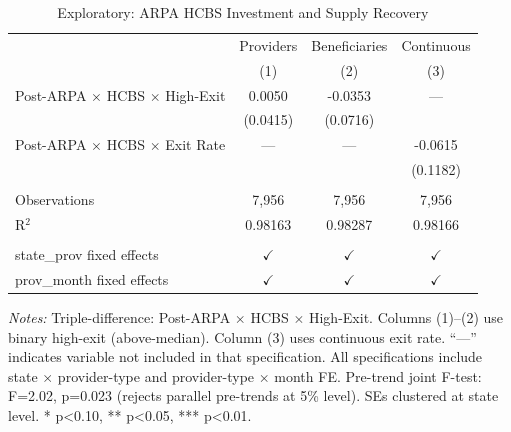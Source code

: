 
\begin{table}[htbp]
   \caption{\label{tab:ddd} Exploratory: ARPA HCBS Investment and Supply Recovery}
   \bigskip
   \centering
   \begin{tabular}{lccc}
      \toprule
                                                   & Providers     & Beneficiaries & Continuous \\   
                                                   & (1)           & (2)           & (3)\\  
      \midrule 
      Post-ARPA $\times$ HCBS $\times$ High-Exit   & 0.0050        & -0.0353       & ---\\
                                                   & (0.0415)      & (0.0716)      & \\
      Post-ARPA $\times$ HCBS $\times$ Exit Rate   & ---           & ---           & -0.0615\\
                                                   &               &               & (0.1182)\\   
       \\
      Observations                                 & 7,956         & 7,956         & 7,956\\  
      R$^2$                                        & 0.98163       & 0.98287       & 0.98166\\  
       \\
      state\_prov fixed effects                    & $\checkmark$  & $\checkmark$  & $\checkmark$\\   
      prov\_month fixed effects                    & $\checkmark$  & $\checkmark$  & $\checkmark$\\   
      \bottomrule
   \end{tabular}
   
   \par \raggedright 
   \textit{Notes:} Triple-difference: Post-ARPA $\times$ HCBS $\times$ High-Exit. Columns (1)--(2) use binary high-exit (above-median). Column (3) uses continuous exit rate. ``---'' indicates variable not included in that specification. All specifications include state $\times$ provider-type and provider-type $\times$ month FE. Pre-trend joint F-test: F=2.02, p=0.023 (rejects parallel pre-trends at 5\% level). SEs clustered at state level. * p<0.10, ** p<0.05, *** p<0.01.
\end{table}



